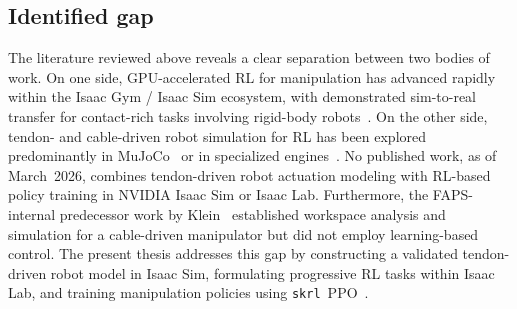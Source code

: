 \subsection{Identified gap}
\label{subsec:prior_gap}

The literature reviewed above reveals a clear separation between two bodies
of work.
On one side, GPU-accelerated \ac{RL} for manipulation has advanced rapidly
within the Isaac Gym / Isaac Sim ecosystem, with demonstrated sim-to-real
transfer for contact-rich tasks involving rigid-body
robots~\cite{Makoviychuk2021IsaacGym,Narang2022Factory,Tang2023IndustReal,Allshire2022TriFinger,Handa2023DeXtreme}.
On the other side, tendon- and cable-driven robot simulation for \ac{RL}
has been explored predominantly in
MuJoCo~\cite{Shahid2023CurriculumTendon,Caggiano2022MyoSuite,Saito2022ContinuumRL,Todorov2012MuJoCo}
or in specialized engines~\cite{Dhakate2025CaRoSaC}.
No published work, as of March~2026, combines tendon-driven robot actuation
modeling with \ac{RL}-based policy training in NVIDIA Isaac Sim or Isaac Lab.
Furthermore, the FAPS-internal predecessor work by Klein~\cite{Klein2023}
established workspace analysis and simulation for a cable-driven manipulator
but did not employ learning-based control.
The present thesis addresses this gap by constructing a validated tendon-driven
robot model in Isaac Sim, formulating progressive \ac{RL} tasks within
Isaac Lab, and training manipulation policies using
\texttt{skrl}~\ac{PPO}~\cite{SerranoMunoz2023skrl,Schulman2017PPO}.
